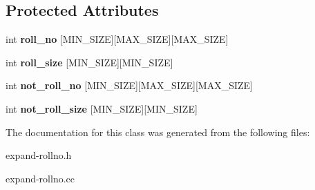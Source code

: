 \subsection*{Protected Attributes}
\begin{DoxyCompactItemize}
\item 
\hypertarget{classExapandRollNo_ae27a8647cfc7f93a5ba2fbfef8afa5c8}{int {\bfseries roll\-\_\-no} \mbox{[}M\-I\-N\-\_\-\-S\-I\-Z\-E\mbox{]}\mbox{[}M\-A\-X\-\_\-\-S\-I\-Z\-E\mbox{]}\mbox{[}M\-A\-X\-\_\-\-S\-I\-Z\-E\mbox{]}}\label{classExapandRollNo_ae27a8647cfc7f93a5ba2fbfef8afa5c8}

\item 
\hypertarget{classExapandRollNo_a892479a25a021a95e9c4b38ed30208a5}{int {\bfseries roll\-\_\-size} \mbox{[}M\-I\-N\-\_\-\-S\-I\-Z\-E\mbox{]}\mbox{[}M\-I\-N\-\_\-\-S\-I\-Z\-E\mbox{]}}\label{classExapandRollNo_a892479a25a021a95e9c4b38ed30208a5}

\item 
\hypertarget{classExapandRollNo_ac3526c93e25b52ab118f66150c980dbd}{int {\bfseries not\-\_\-roll\-\_\-no} \mbox{[}M\-I\-N\-\_\-\-S\-I\-Z\-E\mbox{]}\mbox{[}M\-A\-X\-\_\-\-S\-I\-Z\-E\mbox{]}\mbox{[}M\-A\-X\-\_\-\-S\-I\-Z\-E\mbox{]}}\label{classExapandRollNo_ac3526c93e25b52ab118f66150c980dbd}

\item 
\hypertarget{classExapandRollNo_a809856dbd610c81509f2fdf2cc11e57f}{int {\bfseries not\-\_\-roll\-\_\-size} \mbox{[}M\-I\-N\-\_\-\-S\-I\-Z\-E\mbox{]}\mbox{[}M\-I\-N\-\_\-\-S\-I\-Z\-E\mbox{]}}\label{classExapandRollNo_a809856dbd610c81509f2fdf2cc11e57f}

\end{DoxyCompactItemize}


The documentation for this class was generated from the following files\-:\begin{DoxyCompactItemize}
\item 
expand-\/rollno.\-h\item 
expand-\/rollno.\-cc\end{DoxyCompactItemize}
